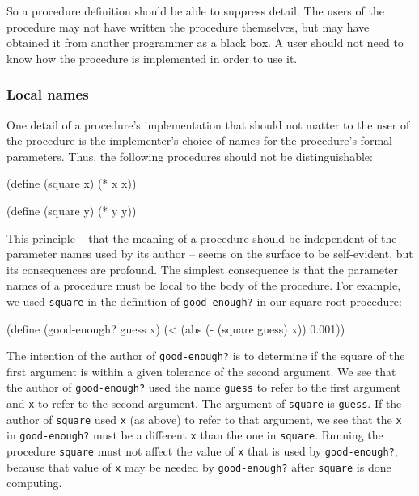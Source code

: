 \begin{schemedisplay}
So a procedure definition should be able to suppress detail.  The
users of the procedure may not have written the procedure themselves,
but may have obtained it from another programmer as a black box.  A
user should not need to know how the procedure is implemented in order
to use it.

\subsubsection*{Local names}

One detail of a procedure's implementation that should not matter to
the user of the procedure is the implementer's choice of names for the
procedure's formal parameters.  Thus, the following procedures should
not be distinguishable:

\begin{schemedisplay}
(define (square x) (* x x))

(define (square y) (* y y))
\end{schemedisplay}

This principle -- that the meaning of a procedure should be independent
of the parameter names used by its author -- seems on the surface to be
self-evident, but its consequences are profound.  The simplest
consequence is that the parameter names of a procedure must be local
to the body of the procedure.  For example, we used \texttt{square} in
the definition of \texttt{good-enough?} in our square-root procedure:

\begin{schemedisplay}
(define (good-enough? guess x)
  (< (abs (- (square guess) x)) 0.001))
\end{schemedisplay}

The intention of the author of \texttt{good-enough?} is to determine if
the square of the first argument is within a given tolerance of the
second argument.  We see that the author of \texttt{good-enough?} used
the name \texttt{guess} to refer to the first argument and \texttt{x} to
refer to the second argument.  The argument of \texttt{square} is \texttt{guess}.  If the author of \texttt{square} used \texttt{x} (as above)
to refer to that argument, we see that the \texttt{x} in \texttt{good-enough?} must be a different \texttt{x} than the one in \texttt{square}.  Running the procedure \texttt{square} must not affect the value
of \texttt{x} that is used by \texttt{good-enough?}, because that value of
\texttt{x} may be needed by \texttt{good-enough?} after \texttt{square} is done
computing.


\end{schemedisplay}

